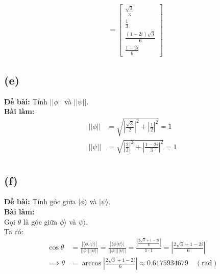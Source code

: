 \begin{align*}
                             & = \begin{bmatrix}
                                     \frac{\sqrt{3}}{3}       \\
                                     \frac{1}{3}              \\
                                     \frac{(1-2i)\sqrt{3}}{6} \\
                                     \frac{1-2i}{6}
                                 \end{bmatrix}
\end{align*}

\subsection{(e)}
\textbf{Đề bài:} Tính $||\phi||$ và $||\psi||$.\\
\textbf{Bài làm:}
\begin{align*}
    ||\phi|| & = \sqrt{\left|\frac{\sqrt{3}}{2}\right|^2 + \left|\frac{1}{2}\right|^2} = 1 \\
    ||\psi|| & = \sqrt{\left|\frac{2}{3}\right|^2 + \left|\frac{1-2i}{3}\right|^2} = 1     \\
\end{align*}

\subsection{(f)}
\textbf{Đề bài:} Tính góc giữa $|\phi\rangle$ và $|\psi\rangle$.\\
\textbf{Bài làm:}\\
Gọi $\theta$ là góc giữa $\phi\rangle$ và $\psi\rangle$.\\
Ta có:
\begin{align*}
    \cos\theta      & = \frac{|\langle\phi, \psi\rangle|}{||\phi||||\psi||}
    = \frac{|\langle\phi|\psi\rangle|}{||\phi||||\psi||}
    = \frac{\left|\frac{2\sqrt{3} + 1 - 2i}{6}\right|}{1 \cdot 1}
    = \left|\frac{2\sqrt{3} + 1 - 2i}{6}\right|                                                                    \\
    \implies \theta & = \arccos\left|\frac{2\sqrt{3} + 1 - 2i}{6}\right| \approx 0.6175934679 \quad (\mathrm{rad})
\end{align*}

